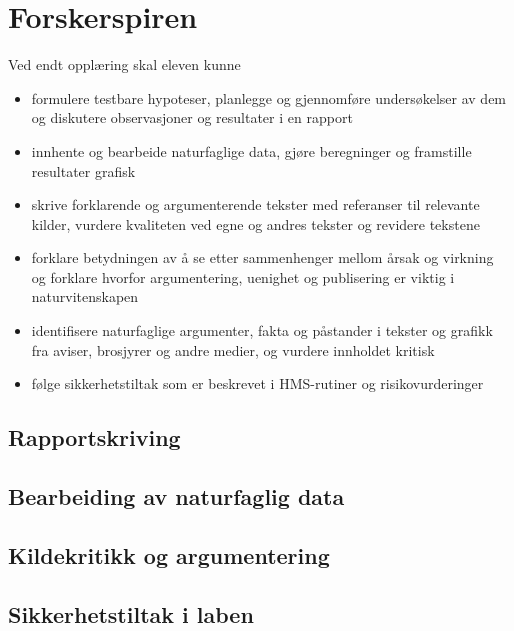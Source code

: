 \documentclass[main.tex]{subfiles}
\begin{document}
\section{Forskerspiren}
Ved endt opplæring skal eleven kunne
\begin{itemize}[noitemsep]
\item formulere testbare hypoteser, planlegge og gjennomføre undersøkelser av dem og diskutere observasjoner og resultater i en rapport
\item innhente og bearbeide naturfaglige data, gjøre beregninger og framstille resultater grafisk
\item skrive forklarende og argumenterende tekster med referanser til relevante kilder, vurdere kvaliteten ved egne og andres tekster og revidere tekstene
\item forklare betydningen av å se etter sammenhenger mellom årsak og virkning og forklare hvorfor argumentering, uenighet og publisering er viktig i naturvitenskapen
\item identifisere naturfaglige argumenter, fakta og påstander i tekster og grafikk fra aviser, brosjyrer og andre medier, og vurdere innholdet kritisk
\item følge sikkerhetstiltak som er beskrevet i HMS-rutiner og risikovurderinger
\end{itemize}

\subsection{Rapportskriving}

\subsection{Bearbeiding av naturfaglig data}

\subsection{Kildekritikk og argumentering}

\subsection{Sikkerhetstiltak i laben}
\end{document}
